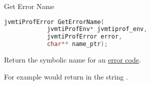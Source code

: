 \begin{apidef}{Get Error Name}
\begin{lstlisting}[language=C]
jvmtiProfError GetErrorName(
            jvmtiProfEnv* jvmtiprof_env,
            jvmtiProfError error,
            char** name_ptr);
\end{lstlisting}

\begin{apidesc}
Return the symbolic name for an \hyperref[api:ec]{error code}.

For example  would return in  the string .
\end{apidesc}

\begin{apiphase}
\apiphaseany
\end{apiphase}

\begin{apicap}
\apicaprequired
\end{apicap}

\begin{apiparam}
\end{apiparam}

\apireturnempty

\begin{apierror}
\end{apierror}
\end{apidef}
